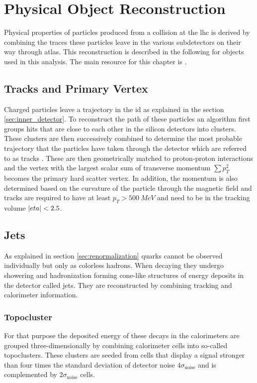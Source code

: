 \chapter{Physical Object Reconstruction}

Physical properties of particles produced from a collision at the \ac{lhc} is derived by combining the traces these particles leave in the various subdetectors on their way through \ac{atlas}. This  reconstruction is described in the following for objects used in this analysis. The main resource for this chapter is \citep{atlas2021optimisation}.

\section{Tracks and Primary Vertex}\label{sec:tracks}
Charged particles leave a trajectory in the \ac{id} as explained in the section \ref{sec:inner_detector}. To reconstruct the path of these particles an algorithm first groups hits that are close to each other in the silicon detectors into clusters. These clusters are then successively combined to determine the most probable trajectory that the particles have taken through the detector which are referred to as tracks \citep{aaboud2017performance}. These are then geometrically matched to proton-proton interactions and the vertex with the largest scalar sum of transverse momentum $\sum p_T^2$ becomes the primary hard scatter vertex. In addition, the momentum is also determined based on the curvature of the particle through the magnetic field and tracks are required to have at least $p_T>\qty[]{500}{MeV}$ and need to be in the tracking volume $\left\vert eta\right\vert<2.5$.

\section{Jets}
As explained in section \ref{sec:renormalization} quarks cannot be observed individually but only as colorless hadrons. When decaying they undergo showering and hadronization forming cone-like structures of energy deposits in the detector called jets. They are reconstructed by combining tracking and calorimeter information.

\subsection{Topocluster}
For that purpose the deposited energy of these decays in the calorimeters are grouped three-dimensionally by combining calorimeter cells into so-called topoclusters. These clusters are seeded from cells that display a signal stronger than four times the standard deviation of detector noise $4\sigma_\mathrm{noise}$ and is complemented by $2\sigma_\mathrm{noise}$ cells.


